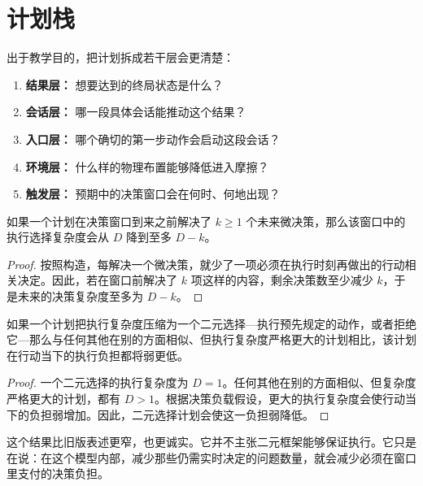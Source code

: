 \section{计划栈}

出于教学目的，把计划拆成若干层会更清楚：
\begin{enumerate}[nosep]
  \item \textbf{结果层：} 想要达到的终局状态是什么？
  \item \textbf{会话层：} 哪一段具体会话能推动这个结果？
  \item \textbf{入口层：} 哪个确切的第一步动作会启动这段会话？
  \item \textbf{环境层：} 什么样的物理布置能够降低进入摩擦？
  \item \textbf{触发层：} 预期中的决策窗口会在何时、何地出现？
\end{enumerate}

\begin{proposition}[执行选择压缩]
如果一个计划在决策窗口到来之前解决了 $k \geq 1$ 个未来微决策，那么该窗口中的执行选择复杂度会从 $D$ 降到至多 $D-k$。
\end{proposition}

\begin{proof}
按照构造，每解决一个微决策，就少了一项必须在执行时刻再做出的行动相关决定。因此，若在窗口前解决了 $k$ 项这样的内容，剩余决策数至少减少 $k$，于是未来的决策复杂度至多为 $D-k$。
\end{proof}

\begin{corollary}[有限定的二元执行优势]
如果一个计划把执行复杂度压缩为一个二元选择---执行预先规定的动作，或者拒绝它---那么与任何其他在别的方面相似、但执行复杂度严格更大的计划相比，该计划在行动当下的执行负担都将弱更低。
\end{corollary}

\begin{proof}
一个二元选择的执行复杂度为 $D=1$。任何其他在别的方面相似、但复杂度严格更大的计划，都有 $D>1$。根据决策负载假设，更大的执行复杂度会使行动当下的负担弱增加。因此，二元选择计划会使这一负担弱降低。
\end{proof}

\begin{discussion}
这个结果比旧版表述更窄，也更诚实。它并不主张二元框架能够保证执行。它只是在说：在这个模型内部，减少那些仍需实时决定的问题数量，就会减少必须在窗口里支付的决策负担。
\end{discussion}